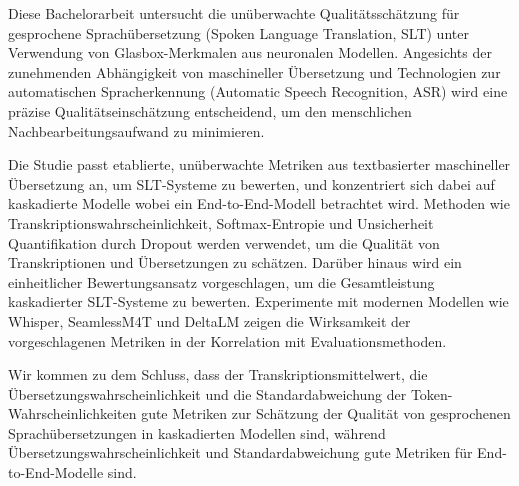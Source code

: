 
\Abstract
Diese Bachelorarbeit untersucht die unüberwachte Qualitätsschätzung für gesprochene Sprachübersetzung (Spoken Language Translation, SLT) unter Verwendung von Glasbox-Merkmalen aus neuronalen Modellen. 
Angesichts der zunehmenden Abhängigkeit von maschineller Übersetzung und Technologien zur automatischen Spracherkennung (Automatic Speech Recognition, ASR) wird eine präzise Qualitätseinschätzung entscheidend, um den menschlichen Nachbearbeitungsaufwand zu minimieren.

Die Studie passt etablierte, unüberwachte Metriken aus textbasierter maschineller Übersetzung an, um SLT-Systeme zu bewerten, und konzentriert sich dabei auf kaskadierte Modelle wobei ein End-to-End-Modell betrachtet wird. 
Methoden wie Transkriptionswahrscheinlichkeit, Softmax-Entropie und Unsicherheit Quantifikation durch Dropout werden verwendet, um die Qualität von Transkriptionen und Übersetzungen zu schätzen. 
Darüber hinaus wird ein einheitlicher Bewertungsansatz vorgeschlagen, um die Gesamtleistung kaskadierter SLT-Systeme zu bewerten. 
Experimente mit modernen Modellen wie Whisper, SeamlessM4T und DeltaLM zeigen die Wirksamkeit der vorgeschlagenen Metriken in der Korrelation mit Evaluationsmethoden. 

Wir kommen zu dem Schluss, dass der Transkriptionsmittelwert, die Übersetzungswahrscheinlichkeit und die Standardabweichung der Token-Wahrscheinlichkeiten gute Metriken zur Schätzung der Qualität von gesprochenen Sprachübersetzungen in kaskadierten Modellen sind, während Übersetzungswahrscheinlichkeit und Standardabweichung gute Metriken für End-to-End-Modelle sind.